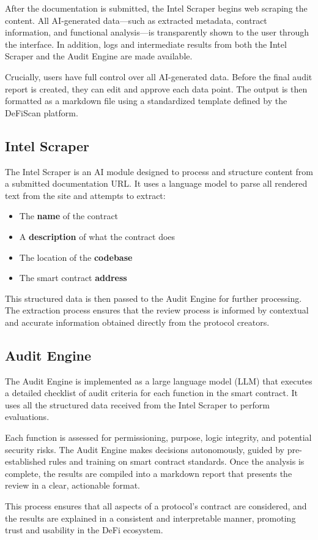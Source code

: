 \documentclass[paper=a4, fontsize=11pt,twoside]{scrartcl}
\begin{document}
	After the documentation is submitted, the Intel Scraper begins web scraping the content. All AI-generated data—such as extracted metadata, contract information, and functional analysis—is transparently shown to the user through the interface. In addition, logs and intermediate results from both the Intel Scraper and the Audit Engine are made available.

	Crucially, users have full control over all AI-generated data. Before the final audit report is created, they can edit and approve each data point. The output is then formatted as a markdown file using a standardized template defined by the DeFiScan platform.

	\subsection{Intel Scraper}

	The Intel Scraper is an AI module designed to process and structure content from a submitted documentation URL. It uses a language model to parse all rendered text from the site and attempts to extract:
	\begin{itemize}
		\item The \textbf{name} of the contract
		\item A \textbf{description} of what the contract does
		\item The location of the \textbf{codebase}
		\item The smart contract \textbf{address}
	\end{itemize}

	This structured data is then passed to the Audit Engine for further processing. The extraction process ensures that the review process is informed by contextual and accurate information obtained directly from the protocol creators.

	\subsection{Audit Engine}

	The Audit Engine is implemented as a large language model (LLM) that executes a detailed checklist of audit criteria for each function in the smart contract. It uses all the structured data received from the Intel Scraper to perform evaluations.

	Each function is assessed for permissioning, purpose, logic integrity, and potential security risks. The Audit Engine makes decisions autonomously, guided by pre-established rules and training on smart contract standards. Once the analysis is complete, the results are compiled into a markdown report that presents the review in a clear, actionable format.

	This process ensures that all aspects of a protocol's contract are considered, and the results are explained in a consistent and interpretable manner, promoting trust and usability in the DeFi ecosystem.
\end{document}
